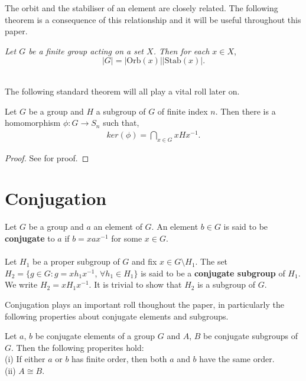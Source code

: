 The orbit and the stabiliser of an element are closely related. The following theorem is a consequence of this relationship and it will be useful throughout this paper. \\

\begin{orbstab} \textit{Let $G$ be a finite group acting on a set $X$. Then for each $x \in X$}, $$|G| = |\text{Orb}(x)| |\text{Stab}(x)|.$$ \\
\end{orbstab}

The following standard theorem will all play a vital roll later on.

\begin{theorem}\label{symhomoker} Let $G$ be a group and $H$ a subgroup of $G$ of finite index $n$. Then there is a homomorphism $\phi : G \longrightarrow S_n$ such that,
\begin{align*} ker(\phi) = \bigcap\limits_{x \in G} x H x^{-1}.
\end{align*}
\end{theorem}

\begin{proof} See \cite[p.110]{bhattacharya} for proof.
\end{proof}

\section{Conjugation}

\begin{definition}
Let $G$ be a group and $a$ an element of $G$. An element $b \in G$ is said to be \textbf{conjugate} to $a$ if $b=xax^{-1}$ for some $x \in G$. \\
\\
Let $H_1$ be a proper subgroup of $G$ and fix $x \in G \setminus H_1$. The set $H_2 = \{g \in G : g= xh_1x^{-1}$, $\forall h_1 \in H_1\}$ is said to be a \textbf{conjugate subgroup} of $H_1$. We write $H_2 = xH_1x^{-1}$. It is trivial to show that $H_2$ is a subgroup of $G$.
\end{definition}

Conjugation plays an important roll thoughout the paper, in particularly the following properties about conjugate elements and subgroups.

\begin{proposition}\label{conjugateprop} Let $a$, $b$ be conjugate elements of a group $G$ and $A$, $B$ be conjugate subgroups of $G$. Then the following properites hold: \vspace{3mm} \\
(i) If either $a$ or $b$ has finite order, then both $a$ and $b$ have the same order. \vspace{3mm} \\
(ii) $A \cong B$. \\
\end{proposition}


